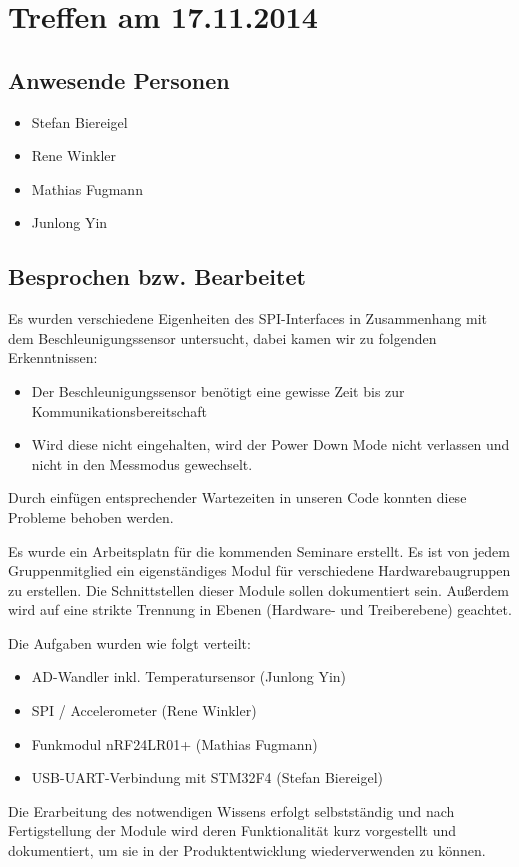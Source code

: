 \chapter{Treffen am 17.11.2014}
\section{Anwesende Personen}
\begin{itemize}
	\item Stefan Biereigel
	\item Rene Winkler
	\item Mathias Fugmann
	\item Junlong Yin
\end{itemize}

\section{Besprochen bzw. Bearbeitet}
Es wurden verschiedene Eigenheiten des SPI-Interfaces in Zusammenhang mit dem Beschleunigungssensor untersucht, dabei kamen wir zu folgenden Erkenntnissen:
\begin{itemize}
	\item Der Beschleunigungssensor benötigt eine gewisse Zeit bis zur Kommunikationsbereitschaft
	\item Wird diese nicht eingehalten, wird der Power Down Mode nicht verlassen und nicht in den Messmodus gewechselt.
\end{itemize}
Durch einfügen entsprechender Wartezeiten in unseren Code konnten diese Probleme behoben werden. 

Es wurde ein Arbeitsplatn für die kommenden Seminare erstellt. Es ist von jedem Gruppenmitglied ein eigenständiges Modul für verschiedene Hardwarebaugruppen zu erstellen. Die Schnittstellen dieser Module sollen dokumentiert sein. Außerdem wird auf eine strikte Trennung in Ebenen (Hardware- und Treiberebene) geachtet.

Die Aufgaben wurden wie folgt verteilt:
\begin{itemize}
	\item AD-Wandler inkl. Temperatursensor (Junlong Yin)
	\item SPI / Accelerometer (Rene Winkler)
	\item Funkmodul nRF24LR01+ (Mathias Fugmann)
	\item USB-UART-Verbindung mit STM32F4 (Stefan Biereigel)
\end{itemize}

Die Erarbeitung des notwendigen Wissens erfolgt selbstständig und nach Fertigstellung der Module wird deren Funktionalität kurz vorgestellt und dokumentiert, um sie in der Produktentwicklung wiederverwenden zu können.